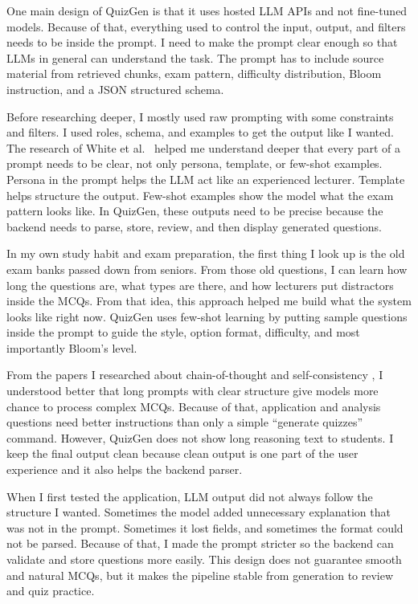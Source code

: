 \documentclass[12pt,a4paper]{article}
\begin{document}
One main design of QuizGen is that it uses hosted LLM APIs and not
fine-tuned models. Because of that, everything used to control the input,
output, and filters needs to be inside the prompt. I need to make the prompt
clear enough so that LLMs in general can understand the task. The prompt has
to include source material from retrieved chunks, exam pattern, difficulty
distribution, Bloom instruction, and a JSON structured schema.

Before researching deeper, I mostly used raw prompting with some constraints
and filters. I used roles, schema, and examples to get the output like I
wanted. The research of White et al.\ \cite{white2023prompt} helped me
understand deeper that every part of a prompt needs to be clear, not only
persona, template, or few-shot examples. Persona in the prompt helps the LLM
act like an experienced lecturer. Template helps structure the output.
Few-shot examples show the model what the exam pattern looks like. In
QuizGen, these outputs need to be precise because the backend needs to parse,
store, review, and then display generated questions.

In my own study habit and exam preparation, the first thing I look up is the
old exam banks passed down from seniors. From those old questions, I can
learn how long the questions are, what types are there, and how lecturers
put distractors inside the MCQs. From that idea, this approach helped me
build what the system looks like right now. QuizGen uses few-shot learning
\cite{brown2020gpt3} by putting sample questions inside the prompt to guide
the style, option format, difficulty, and most importantly Bloom's level.

From the papers I researched about chain-of-thought and self-consistency
\cite{wei2022cot,wang2022selfconsistency}, I understood better that long
prompts with clear structure give models more chance to process complex
MCQs. Because of that, application and analysis questions need better
instructions than only a simple ``generate quizzes'' command. However,
QuizGen does not show long reasoning text to students. I keep the final
output clean because clean output is one part of the user experience and it
also helps the backend parser.

When I first tested the application, LLM output did not always follow the
structure I wanted. Sometimes the model added unnecessary explanation that
was not in the prompt. Sometimes it lost fields, and sometimes the format
could not be parsed. Because of that, I made the prompt stricter so the
backend can validate and store questions more easily. This design does not
guarantee smooth and natural MCQs, but it makes the pipeline stable from
generation to review and quiz practice.
\end{document}

